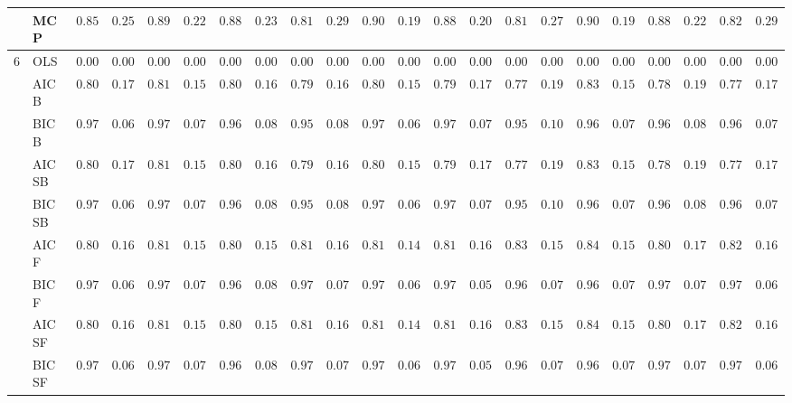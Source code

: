 \begin{tabular}{ll|ll|llllll|llllll|llllll}
 & MCP  & $0.8567$ & $0.2518$ & $0.8917$ & $0.2289$ & $0.8817$ & $0.2349$ & $0.8183$ & $0.2969$ & $0.9083$ & $0.1944$ & $0.8833$ & $0.2017$ & $0.8100$ & $0.2773$ & $0.9067$ & $0.1929$ & $0.8850$ & $0.2281$ & $0.8233$ & $0.2957$ \\\hline
6 & OLS  & $0.0000$ & $0.0000$ & $0.0000$ & $0.0000$ & $0.0000$ & $0.0000$ & $0.0000$ & $0.0000$ & $0.0000$ & $0.0000$ & $0.0000$ & $0.0000$ & $0.0000$ & $0.0000$ & $0.0000$ & $0.0000$ & $0.0000$ & $0.0000$ & $0.0000$ & $0.0000$ \\
 & AIC B  & $0.8017$ & $0.1752$ & $0.8150$ & $0.1587$ & $0.8033$ & $0.1613$ & $0.7950$ & $0.1639$ & $0.8017$ & $0.1584$ & $0.7917$ & $0.1731$ & $0.7783$ & $0.1925$ & $0.8333$ & $0.1553$ & $0.7817$ & $0.1905$ & $0.7750$ & $0.1731$ \\
 & BIC B  & $0.9717$ & $0.0672$ & $0.9717$ & $0.0713$ & $0.9650$ & $0.0864$ & $0.9583$ & $0.0898$ & $0.9700$ & $0.0686$ & $0.9717$ & $0.0713$ & $0.9500$ & $0.1019$ & $0.9650$ & $0.0796$ & $0.9633$ & $0.0840$ & $0.9650$ & $0.0796$ \\
 & AIC SB  & $0.8017$ & $0.1752$ & $0.8150$ & $0.1587$ & $0.8033$ & $0.1613$ & $0.7950$ & $0.1639$ & $0.8017$ & $0.1584$ & $0.7917$ & $0.1731$ & $0.7783$ & $0.1925$ & $0.8333$ & $0.1553$ & $0.7817$ & $0.1905$ & $0.7750$ & $0.1731$ \\
 & BIC SB  & $0.9717$ & $0.0672$ & $0.9717$ & $0.0713$ & $0.9650$ & $0.0864$ & $0.9583$ & $0.0898$ & $0.9700$ & $0.0686$ & $0.9717$ & $0.0713$ & $0.9500$ & $0.1019$ & $0.9650$ & $0.0796$ & $0.9633$ & $0.0840$ & $0.9650$ & $0.0796$ \\
 & AIC F  & $0.8050$ & $0.1659$ & $0.8150$ & $0.1587$ & $0.8067$ & $0.1584$ & $0.8133$ & $0.1680$ & $0.8100$ & $0.1499$ & $0.8167$ & $0.1615$ & $0.8300$ & $0.1553$ & $0.8400$ & $0.1552$ & $0.8083$ & $0.1714$ & $0.8217$ & $0.1663$ \\
 & BIC F  & $0.9717$ & $0.0672$ & $0.9717$ & $0.0713$ & $0.9650$ & $0.0864$ & $0.9717$ & $0.0713$ & $0.9700$ & $0.0686$ & $0.9783$ & $0.0563$ & $0.9650$ & $0.0796$ & $0.9683$ & $0.0738$ & $0.9700$ & $0.0726$ & $0.9750$ & $0.0643$ \\
 & AIC SF  & $0.8050$ & $0.1659$ & $0.8150$ & $0.1587$ & $0.8067$ & $0.1584$ & $0.8133$ & $0.1680$ & $0.8100$ & $0.1499$ & $0.8167$ & $0.1615$ & $0.8317$ & $0.1526$ & $0.8400$ & $0.1552$ & $0.8083$ & $0.1714$ & $0.8233$ & $0.1638$ \\
 & BIC SF  & $0.9717$ & $0.0672$ & $0.9717$ & $0.0713$ & $0.9650$ & $0.0864$ & $0.9717$ & $0.0713$ & $0.9700$ & $0.0686$ & $0.9783$ & $0.0563$ & $0.9667$ & $0.0786$ & $0.9683$ & $0.0738$ & $0.9700$ & $0.0726$ & $0.9750$ & $0.0643$ \\

\end{tabular}
